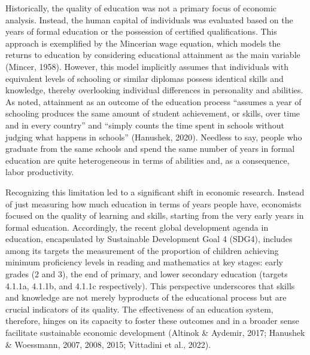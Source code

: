 \documentclass[
]{article}
\begin{document}
Historically, the quality of education was not a primary focus of
economic analysis. Instead, the human capital of individuals was
evaluated based on the years of formal education or the possession of
certified qualifications. This approach is exemplified by the Mincerian
wage equation, which models the returns to education by considering
educational attainment as the main variable (Mincer, 1958). However,
this model implicitly assumes that individuals with equivalent levels of
schooling or similar diplomas possess identical skills and knowledge,
thereby overlooking individual differences in personality and abilities.
As noted, attainment as an outcome of the education process ``assumes a
year of schooling produces the same amount of student achievement, or
skills, over time and in every country'' and ``simply counts the time
spent in schools without judging what happens in schools'' (Hanushek,
2020). Needless to say, people who graduate from the same schools and
spend the same number of years in formal education are quite
heterogeneous in terms of abilities and, as a consequence, labor
productivity.

Recognizing this limitation led to a significant shift in economic
research. Instead of just measuring how much education in terms of years
people have, economists focused on the quality of learning and skills,
starting from the very early years in formal education. Accordingly, the
recent global development agenda in education, encapsulated by
Sustainable Development Goal 4 (SDG4), includes among its targets the
measurement of the proportion of children achieving minimum proficiency
levels in reading and mathematics at key stages: early grades (2 and 3),
the end of primary, and lower secondary education (targets 4.1.1a,
4.1.1b, and 4.1.1c respectively). This perspective underscores that
skills and knowledge are not merely byproducts of the educational
process but are crucial indicators of its quality. The effectiveness of
an education system, therefore, hinges on its capacity to foster these
outcomes and in a broader sense facilitate sustainable economic
development (Altinok \& Aydemir, 2017; Hanushek \& Woessmann, 2007,
2008, 2015; Vittadini et al., 2022).
\end{document}
